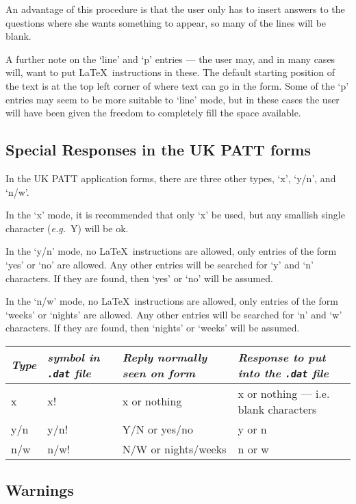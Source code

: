 An advantage of this procedure is that the user only has to insert answers
to the questions where she wants something to appear, so many of the lines
will be blank. 

A further note on the `line' and `p' entries --- the user may, and in many
cases will, want to put \LaTeX\ instructions in these. The default starting
position of the text is at the top left corner of where text can go in the
form. Some of the `p' entries may seem to be more suitable to `line' mode,
but in these cases the  user will have been given the freedom to completely
fill the space available. 

\subsection { Special Responses in the UK PATT forms}

In the UK PATT application forms, there are three other types, `x', `y/n',
and `n/w'. 

In the `x' mode, it is recommended that only `x' be used, but any smallish
single character ({\it e.g.}~{\small Y}) will be ok. 

In the `y/n' mode, no \LaTeX\ instructions are allowed, only entries of the
form `yes' or `no' are allowed. Any other entries will be searched for `y'
and `n' characters. If they are found, then `yes' or `no' will be assumed. 

In the `n/w' mode, no \LaTeX\ instructions are allowed, only entries of the
form `weeks' or `nights' are allowed. Any other entries will be searched
for `n' and `w' characters. If they are found, then `nights' or `weeks' will
be assumed. 


{\small
\begin{tabular}{|l|p{0.6in}|p{1.2in}|p{3.5in}|} \hline
{\it Type} & {\it symbol in {\tt .dat} file}   & {\it Reply normally seen on 
form} & {\it Response to put into the {\tt .dat} file} \\ \hline
x     &    x!  &   x or nothing    &  x or nothing --- i.e. blank characters \\ \hline
y/n   &  y/n!  &   Y/N or yes/no   &  y or n \\  \hline
n/w   &  n/w!  &   N/W or nights/weeks &  n  or w \\  \hline
\end{tabular}}


\subsection{Warnings}

